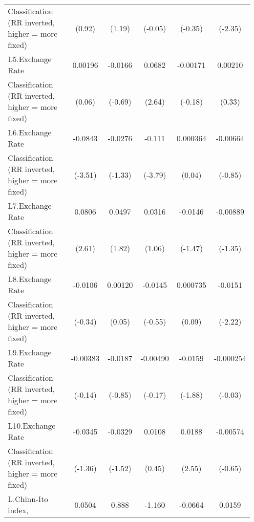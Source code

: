 {\begin{tabular}{l*{5}{c}}
Classification (RR inverted, higher = more fixed)&      (0.92)         &      (1.19)         &     (-0.05)         &     (-0.35)         &     (-2.35)         \\
[1em]
L5.Exchange Rate    &     0.00196         &     -0.0166         &      0.0682\sym{**} &    -0.00171         &     0.00210         \\
Classification (RR inverted, higher = more fixed)&      (0.06)         &     (-0.69)         &      (2.64)         &     (-0.18)         &      (0.33)         \\
[1em]
L6.Exchange Rate    &     -0.0843\sym{***}&     -0.0276         &      -0.111\sym{***}&    0.000364         &    -0.00664         \\
Classification (RR inverted, higher = more fixed)&     (-3.51)         &     (-1.33)         &     (-3.79)         &      (0.04)         &     (-0.85)         \\
[1em]
L7.Exchange Rate    &      0.0806\sym{*}  &      0.0497         &      0.0316         &     -0.0146         &    -0.00889         \\
Classification (RR inverted, higher = more fixed)&      (2.61)         &      (1.82)         &      (1.06)         &     (-1.47)         &     (-1.35)         \\
[1em]
L8.Exchange Rate    &     -0.0106         &     0.00120         &     -0.0145         &    0.000735         &     -0.0151\sym{*}  \\
Classification (RR inverted, higher = more fixed)&     (-0.34)         &      (0.05)         &     (-0.55)         &      (0.09)         &     (-2.22)         \\
[1em]
L9.Exchange Rate    &    -0.00383         &     -0.0187         &    -0.00490         &     -0.0159         &   -0.000254         \\
Classification (RR inverted, higher = more fixed)&     (-0.14)         &     (-0.85)         &     (-0.17)         &     (-1.88)         &     (-0.03)         \\
[1em]
L10.Exchange Rate   &     -0.0345         &     -0.0329         &      0.0108         &      0.0188\sym{*}  &    -0.00574         \\
Classification (RR inverted, higher = more fixed)&     (-1.36)         &     (-1.52)         &      (0.45)         &      (2.55)         &     (-0.65)         \\
[1em]
L.Chinn-Ito index,  &      0.0504         &       0.888         &      -1.160         &     -0.0664         &      0.0159         \\

\end{tabular}}
